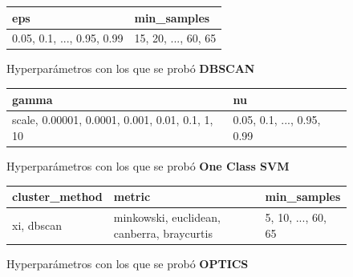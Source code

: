 		\begin{figure}[htb]
			\centering
			\begin{tabular}{ll}
				\toprule
				                                          eps &                                  min\_samples \\
				\midrule
				  0.05, 0.1, ..., 0.95, 0.99 &  15, 20, ..., 60, 65 \\
				\bottomrule
			\end{tabular}
			\caption{Hyperparámetros con los que se probó \textbf{DBSCAN}}
			\label{table:4}
		\end{figure}
		
		\begin{figure}[htb]
			\centering
			\begin{tabular}{ll}
				\toprule
				                                            gamma &                                                 nu \\
				\midrule
				  scale, 0.00001, 0.0001, 0.001, 0.01, 0.1, 1, 10 &  0.05, 0.1, ..., 0.95, 0.99 \\
				\bottomrule
			\end{tabular}
			\caption{Hyperparámetros con los que se probó \textbf{One Class SVM}}
			\label{table:5}
		\end{figure}
		
		\begin{figure}[htb]
			\centering
			\begin{tabular}{lll}
				\toprule
				 cluster\_method &                                      metric &                                        min\_samples \\
				\midrule
				     xi, dbscan &  minkowski, euclidean, canberra, braycurtis &  5, 10, ..., 60, 65 \\
				\bottomrule
			\end{tabular}
			\caption{Hyperparámetros con los que se probó \textbf{OPTICS}}
			\label{table:6}
		\end{figure}

